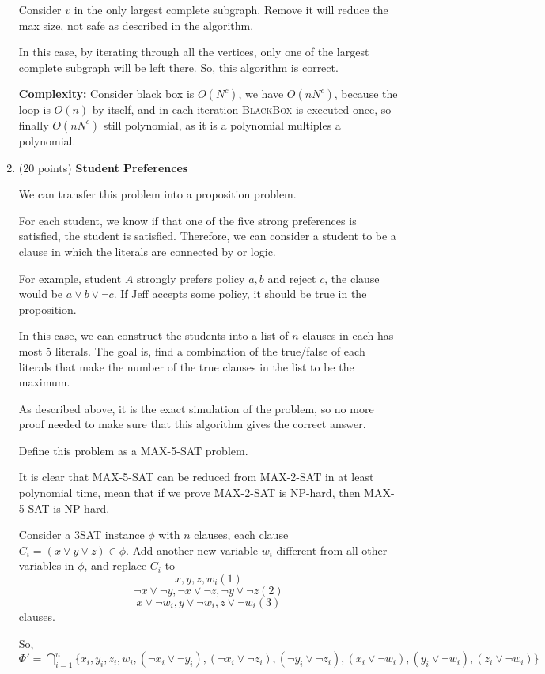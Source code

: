 \documentclass{article}
\newcommand{\Complexity}{\textbf{Complexity: }}
\newcounter{problem}
\begin{document}
\begin{enumerate}[topsep=0pt,parsep=1mm]
Consider $v$ in the only largest complete subgraph.
Remove it will reduce the max size, not safe as described in the algorithm.

In this case, by iterating through all the vertices, 
only one of the largest complete subgraph will be left there.
So, this algorithm is correct.
 

\Complexity
Consider black box is $O(N^c)$, we have $O(nN^c)$, because the loop is $O(n)$ by itself,
and in each iteration \textsc{BlackBox} is executed once,
so finally $O(nN^c)$ still polynomial, as it is a polynomial multiples a polynomial.

\item (20 points) \textbf{Student Preferences} 

We can transfer this problem into a proposition problem.

For each student, we know if that one of the five strong preferences is satisfied, the student is satisfied.
Therefore, we can consider a student to be a clause in which the literals are connected by or logic.

For example, student $A$ strongly prefers policy $a,b$ and reject $c$, the clause would be $a\lor b\lor\neg c$.
If Jeff accepts some policy, it should be true in the proposition.

In this case, we can construct the students into a list of $n$ clauses in each has most 5 literals.
The goal is, find a combination of the true/false of each literals that make the number of the true clauses in the list to be the maximum.

As described above, it is the exact simulation of the problem, so no more proof needed to make sure that this algorithm gives the correct answer.

Define this problem as a MAX-5-SAT problem.

It is clear that MAX-5-SAT can be reduced from MAX-2-SAT in at least polynomial time,
mean that if we prove MAX-2-SAT is NP-hard, then MAX-5-SAT is NP-hard.

Consider a 3SAT instance $\phi$ with $n$ clauses, 
each clause $C_i=(x\lor y\lor z)\in\phi$.
Add another new variable $w_i$ different from all other variables in $\phi$,
and replace $C_i$ to 
$$x,y,z,w_i (1)$$
$$\neg x\lor \neg y,\neg x\lor\neg z,\neg y\lor \neg z (2)$$
$$x\lor \neg w_i,y\lor \neg w_i,z\lor\neg w_i (3)$$ clauses.

So, $\Phi'=\bigcap_{i=1}^n\{x_i, y_i, z_i , w_i,(\neg x_i\lor\neg y_i),(\neg x_i\lor\neg z_i),(\neg y_i\lor \neg z_i),(x_i\lor \neg w_i),(y_i\lor \neg w_i),(z_i\lor\neg w_i)\}$


\end{enumerate}
\end{document}
